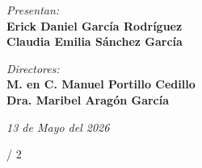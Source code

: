 \begin{titlepage}
\begin{minipage}[c][\textheight][c]{13cm}
    {\fontsize{14}{16}\selectfont\textit{Presentan:}}\\[0.5cm]
    {\fontsize{16}{18}\selectfont\textbf{Erick Daniel García Rodríguez} }\\
    {\fontsize{16}{18}\selectfont\textbf{Claudia Emilia Sánchez García} }

    \vfill

    {\fontsize{14}{16}\selectfont\textit{Directores:}}\\[0.8cm]
    \fontsize{14}{16}\selectfont\textbf{M. en C. Manuel Portillo Cedillo}\\
    \textbf{Dra. Maribel Aragón García}

    \vfill
    {\fontsize{12}{14}\selectfont\textit{13 de Mayo del 2026}}

    \begin{flushright}
        {\fontsize{12}{14} / 2}
    \end{flushright}
\end{minipage}

\end{titlepage}
\restoregeometry